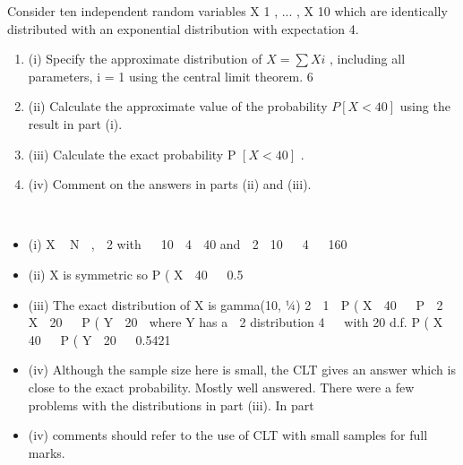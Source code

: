 \documentclass[a4paper,12pt]{article}
\begin{document}
Consider ten independent random variables X 1 , ... , X 10 which are identically
distributed with an exponential distribution with expectation 4.
\begin{enumerate}
\item (i)
Specify the approximate distribution of $X = \sum  X i$ , including all parameters,
i = 1
using the central limit theorem.
6

\item (ii) Calculate the approximate value of the probability $P [ X < 40]$ using the result
in part (i).

\item (iii) Calculate the exact probability P $[ X < 40]$ .
\item (iv) Comment on the answers in parts (ii) and (iii).
\end{enumerate}



\begin{itemize}
\item (i) X ~ N  ,  2 with   10  4  40 and  2  10   4   160
\item (ii) X is symmetric so P ( X  40   0.5
\item (iii) The exact distribution of X is gamma(10, 1⁄4)
2
 1

P ( X  40   P  2   X  20   P ( Y  20  where Y has a  2 distribution
4


with 20 d.f.
P ( X  40   P ( Y  20   0.5421
\item (iv)
Although the sample size here is small, the CLT gives an answer which is
close to the exact probability.
Mostly well answered. There were a few problems with the distributions in part (iii). In part
\item (iv) comments should refer to the use of CLT with small samples for full marks.
\end{itemize}
\end{document}
